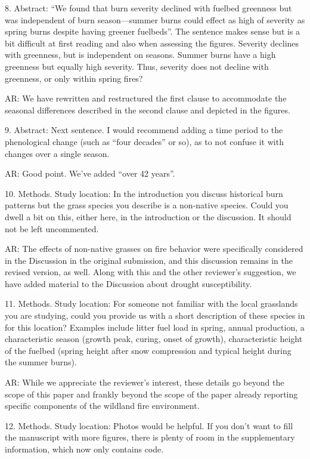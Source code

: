 \documentclass[parskip=half, american]{scrartcl}
\newcommand{\AR}[1]
	{\color{PineGreen}AR: #1\color{black} \par }
\begin{document}
8.	Abstract: ``We found that burn severity declined with fuelbed greenness but was independent of burn season—summer burns could effect as high of severity as spring burns despite having greener fuelbeds''. The sentence makes sense but is a bit difficult at first reading and also when assessing the figures. Severity declines with greenness, but is independent on seasons. Summer burns have a high greenness but equally high severity. Thus, severity does not decline with greenness, or only within spring fires?

\AR{We have rewritten and restructured the first clause to accommodate the seasonal differences described in the second clause and depicted in the figures.  }

9.	Abstract: Next sentence. I would recommend adding a time period to the phenological change (such as ``four decades'' or so), as to not confuse it with changes over a single season. 

\AR{Good point. We've added ``over 42 years''.  }

10.	Methods. Study location: In the introduction you discuss historical burn patterns but the grass species you describe is a non-native species. Could you dwell a bit on this, either here, in the introduction or the discussion. It should not be left uncommented. 

\AR{ The effects of non-native grasses on fire behavior were specifically considered in the Discussion in the original submission, and this discussion remains in the revised version, as well.
Along with this and the other reviewer's suggestion, we have added material to the Discussion about drought susceptibility. }

11.	Methods. Study location: For someone not familiar with the local grasslands you are studying, could you provide us with a short description of these species in for this location? Examples include litter fuel load in spring, annual production, a characteristic season (growth peak, curing, onset of growth), characteristic height of the fuelbed (spring height after snow compression and typical height during the summer burns). 

\AR{ While we appreciate the reviewer's interest, these details go beyond the scope of this paper and frankly beyond the scope of the paper already reporting specific components of the wildland fire environment.  }

12.	Methods. Study location: Photos would be helpful. If you don’t want to fill the manuscript with more figures, there is plenty of room in the supplementary information, which now only contains code. 
\end{document}
